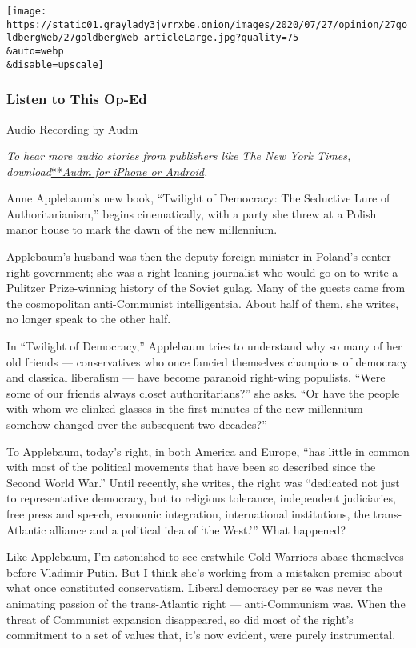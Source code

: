 \texttt{[image: https://static01.graylady3jvrrxbe.onion/images/2020/07/27/opinion/27goldbergWeb/27goldbergWeb-articleLarge.jpg?quality=75\\\&auto=webp\\\&disable=upscale]}

\hypertarget{listen-to-this-op-ed}{%
\subsubsection{Listen to This Op-Ed}\label{listen-to-this-op-ed}}

Audio Recording by Audm

\emph{To hear more audio stories from publishers like The New York
Times,
download}\href{https://www.audm.com/?utm_source=nytmag\&utm_medium=embed\&utm_campaign=left_behind_draper}{**}\href{https://www.audm.com/?utm_source=nytopinion\&utm_medium=embed\&utm_campaign=twilight_liberal_right}{\emph{Audm
for iPhone or Android}}\emph{.}

Anne Applebaum's new book, ``Twilight of Democracy: The Seductive Lure
of Authoritarianism,'' begins cinematically, with a party she threw at a
Polish manor house to mark the dawn of the new millennium.

Applebaum's husband was then the deputy foreign minister in Poland's
center-right government; she was a right-leaning journalist who would go
on to write a Pulitzer Prize-winning history of the Soviet gulag. Many
of the guests came from the cosmopolitan anti-Communist intelligentsia.
About half of them, she writes, no longer speak to the other half.

In ``Twilight of Democracy,'' Applebaum tries to understand why so many
of her old friends --- conservatives who once fancied themselves
champions of democracy and classical liberalism --- have become paranoid
right-wing populists. ``Were some of our friends always closet
authoritarians?'' she asks. ``Or have the people with whom we clinked
glasses in the first minutes of the new millennium somehow changed over
the subsequent two decades?''

To Applebaum, today's right, in both America and Europe, ``has little in
common with most of the political movements that have been so described
since the Second World War.'' Until recently, she writes, the right was
``dedicated not just to representative democracy, but to religious
tolerance, independent judiciaries, free press and speech, economic
integration, international institutions, the trans-Atlantic alliance and
a political idea of `the West.''' What happened?

Like Applebaum, I'm astonished to see erstwhile Cold Warriors abase
themselves before Vladimir Putin. But I think she's working from a
mistaken premise about what once constituted conservatism. Liberal
democracy per se was never the animating passion of the trans-Atlantic
right --- anti-Communism was. When the threat of Communist expansion
disappeared, so did most of the right's commitment to a set of values
that, it's now evident, were purely instrumental.

